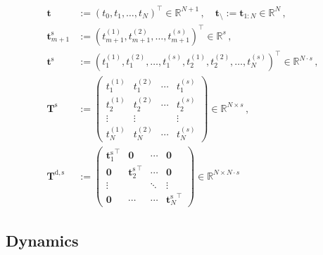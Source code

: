 \documentclass{article}
\newcommand{\defeq}{\mathrel{:=}}%
\newcommand{\tp}{\top}%
\newcommand{\setR}{\mathbb{R}}%
\newcommand{\vectorfont}[1]{\boldsymbol{#1}}%
\newcommand{\matrixfont}[1]{\mathbf{#1}}%
\newcommand{\tvec}{\vectorfont{t}}
\newcommand{\Tmat}{\matrixfont{T}}
\newcommand{\Nullmat}{\matrixfont{0}}
\begin{document}
\begin{align*}
\tvec &\defeq (t_0, t_1, \ldots, t_{N})^{\tp} \in \setR^{N+1}\,,\quad \tvec_{\setminus} \defeq \tvec_{1:N} \in \setR^N\,,
\\
\tvec_{m+1}^{\mathrm{s}} &\defeq (t_{m+1}^{(1)}, t_{m+1}^{(2)}, \ldots, t_{m+1}^{(s)})^{\tp} \in \setR^{s}\,,
\\
\tvec^{\mathrm{s}} &\defeq (t_1^{(1)}, t_1^{(2)}, \ldots, t_1^{(s)}, t_2^{(1)}, t_2^{(2)}, \ldots, t_N^{(s)})^{\tp} \in \setR^{N \cdot s}\,,
\\
\Tmat^{\mathrm{s}} &\defeq \begin{pmatrix}t_1^{(1)} & t_1^{(2)}& \cdots & t_1^{(s)}\\
t_2^{(1)} & t_2^{(2)}& \cdots & t_2^{(s)}\\
\vdots & \vdots&  & \vdots\\
t_N^{(1)} & t_N^{(2)}& \cdots & t_N^{(s)}
             \end{pmatrix} \in \setR^{N \times s}\,,
\\
\Tmat^{\mathrm{d,s}} &\defeq \begin{pmatrix}
{\tvec_1^{\mathrm{s}}}^{\tp} & \Nullmat  & \cdots & \Nullmat\\
\Nullmat               & {\tvec_2^{\mathrm{s}}}^{\tp} & \cdots & \Nullmat \\
\vdots                 &                          & \ddots & \vdots  \\
\Nullmat               & \cdots                   & \cdots & {\tvec_N^{\mathrm{s}}}^{\tp} 
\end{pmatrix} \in \setR^{N \times N \cdot s}
\end{align*}

\subsection*{Dynamics}
\end{document}
